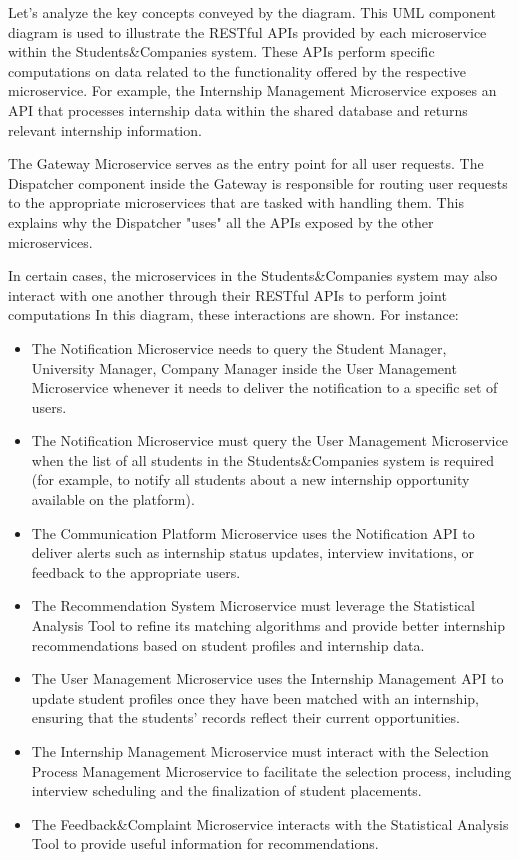 Let’s analyze the key concepts conveyed by the diagram. This UML component diagram is used to illustrate the RESTful APIs provided by each microservice within the Students\&Companies system. These APIs perform specific computations on data related to the functionality offered by the respective microservice. For example, the Internship Management Microservice exposes an API that processes internship data within the shared database and returns relevant internship information.

The Gateway Microservice serves as the entry point for all user requests. The Dispatcher component inside the Gateway is responsible for routing user requests to the appropriate microservices that are tasked with handling them. This explains why the Dispatcher "uses" all the APIs exposed by the other microservices.

In certain cases, the microservices in the Students\&Companies system may also interact with one another through their RESTful APIs to perform joint computations In this diagram, these interactions are shown. For
instance:

\begin{itemize}
    \item The Notification Microservice needs to query the Student Manager, University Manager, Company Manager inside the User Management Microservice whenever it needs to deliver the notification to a specific set of users.
    \item The Notification Microservice must query the User Management Microservice when the list of all students in the Students\&Companies system is required (for example, to notify all students about a new internship opportunity available on the platform).
    \item The Communication Platform Microservice uses the Notification API to deliver alerts such as internship status updates, interview invitations, or feedback to the appropriate users.
    \item The Recommendation System Microservice must leverage the Statistical Analysis Tool to refine its matching algorithms and provide better internship recommendations based on student profiles and internship data.
    \item The User Management Microservice uses the Internship Management API to update student profiles once they have been matched with an internship, ensuring that the students' records reflect their current opportunities.
    \item The Internship Management Microservice must interact with the Selection Process Management Microservice to facilitate the selection process, including interview scheduling and the finalization of student placements.
    \item The Feedback\&Complaint Microservice interacts with the Statistical Analysis Tool to provide useful information for recommendations.
\end{itemize}


